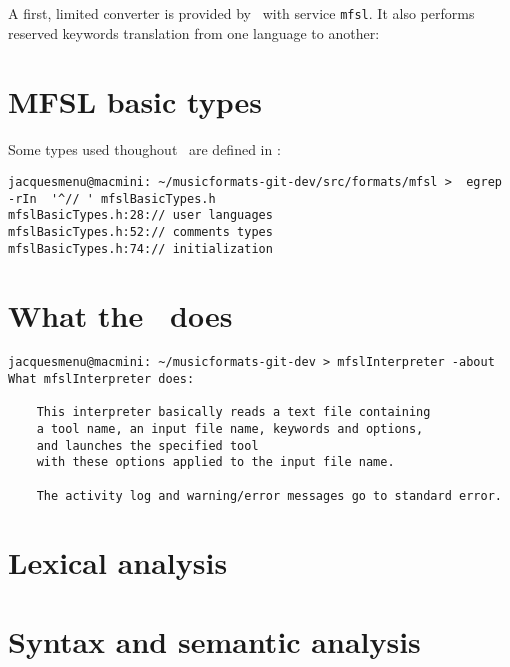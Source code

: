 A first, limited converter is provided by \mf\, with service {\tt mfsl}. It also performs reserved keywords translation from one language to another:


\section{MFSL basic types}\label{MFSL basic types}

Some types used thoughout \msrRepr\ are defined in :%
\begin{lstlisting}[language=Terminal]
jacquesmenu@macmini: ~/musicformats-git-dev/src/formats/mfsl >  egrep -rIn  '^// ' mfslBasicTypes.h
mfslBasicTypes.h:28:// user languages
mfslBasicTypes.h:52:// comments types
mfslBasicTypes.h:74:// initialization
\end{lstlisting}


\section{What the \mfslLangInterp\ does}

\begin{lstlisting}[language=Terminal]
jacquesmenu@macmini: ~/musicformats-git-dev > mfslInterpreter -about
What mfslInterpreter does:

    This interpreter basically reads a text file containing
    a tool name, an input file name, keywords and options,
    and launches the specified tool
    with these options applied to the input file name.

    The activity log and warning/error messages go to standard error.
\end{lstlisting}


\section{Lexical analysis}


\section{Syntax and semantic analysis}


